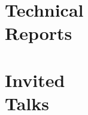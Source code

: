 \documentclass[margin,line]{resume}
\begin{document}
\begin{resume}
    \section{\mysidestyle Technical\\Reports}
    \begin{bibenum}
       \item {}
    \end{bibenum}

    \section{\mysidestyle Invited\\Talks}


\end{resume}
\end{document}
